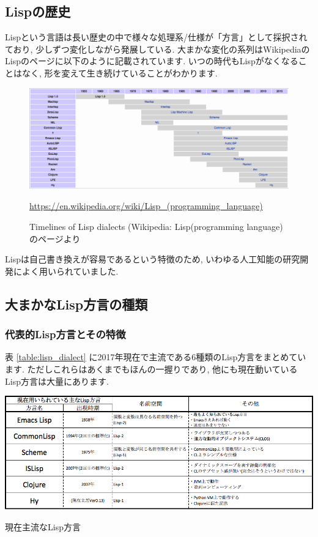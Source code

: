 \documentclass[mingoth,a4paper]{jsarticle}
\begin{document}
\subsection{Lispの歴史}

Lispという言語は長い歴史の中で様々な処理系/仕様が「方言」として採択されており, 少しずつ変化しながら発展している. 
大まかな変化の系列はWikipediaのLispのページに以下のように記載されています.
いつの時代もLispがなくなることはなく, 形を変えて生き続けていることがわかります.

\pagebreak

\begin{figure}[htbp!]
\centering
\includegraphics[width=\linewidth]{image201709-kansai/time-lines-lisp-dialect.png}
\caption{Timelines of Lisp dialects (Wikipedia: Lisp(programming language)のページより}
\url{https://en.wikipedia.org/wiki/Lisp_(programming_language)}
\end{figure}

Lispは自己書き換えが容易であるという特徴のため, いわゆる人工知能の研究開発によく用いられていました.

\subsection{大まかなLisp方言の種類}

\subsubsection{代表的Lisp方言とその特徴}
表 \ref{table:lisp_dialect} に2017年現在で主流である6種類のLisp方言をまとめています. ただしこれらはあくまでもほんの一握りであり, 他にも現在動いているLisp方言は大量にあります. 

\begin{table}[htbp!]
\centering
\includegraphics[width=\linewidth]{image201709-kansai/lisp-dial.png}
\caption{現在主流なLisp方言}\label{table:lisp_dialect}
\end{table}
\end{document}
